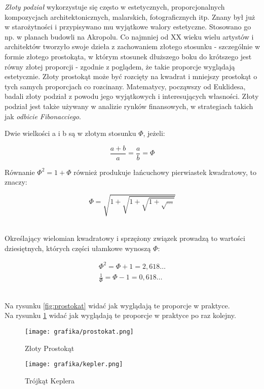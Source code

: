 \documentclass{article}
\begin{document}
\emph{Złoty podział} wykorzystuje się często w estetycznych, proporcjonalnych kompozycjach architektonicznych, malarskich, fotograficznych itp. Znany był już w starożytności i przypisywano mu wyjątkowe walory estetyczne. Stosowano go np. w planach budowli na Akropolu. Co najmniej od XX wieku wielu artystów i architektów tworzyło swoje dzieła z zachowaniem złotego stosunku - szczególnie w formie złotego prostokąta, w którym stosunek dłuższego boku do krótszego jest równy złotej proporcji - zgodnie z poglądem, że takie proporcje wyglądają estetycznie. Złoty prostokąt może być rozcięty na kwadrat i mniejszy prostokąt o tych samych proporcjach co rozcinany. Matematycy, począwszy od Euklidesa, badali złoty podział z powodu jego wyjątkowych i interesujących własności. Złoty podział jest także używany w analizie rynków finansowych, w strategiach takich jak \emph{odbicie Fibonacciego}.
\\
 \begin{center}Dwie wielkości a i b są w złotym stosunku $\Phi$, jeżeli:\end{center}
\begin{equation}
\frac{a+b}{a} = \frac{a}{b} = \Phi
\end{equation}
\begin{center} Równanie \begin{math} \Phi^{2} = 1 + \Phi \end{math} również produkuje łańcuchowy pierwiastek kwadratowy, to znaczy:\end{center}
\begin{equation}
\Phi = \sqrt{ 1+\sqrt{1+{\sqrt{1+{\sqrt{\ldots}}}}}}
\end{equation}
\\
\begin{center}Określający wielomian kwadratowy i sprzężony związek prowadzą to wartości dziesiętnych, których części ułamkowe wynoszą $\Phi$:\end{center}
\begin{eqnarray}
\Phi^{2} = \Phi + 1 = 2,618\ldots
\\
\frac{1}{\Phi} = \Phi - 1 = 0,618\ldots
\end{eqnarray}
\\
\begin{flushright}
Na rysunku \ref{fig:prostokat} widać jak wyglądają te proporcje w praktyce.
\\
Na rysunku \ref{fig:kepler} widać jak wyglądają te proporcje w praktyce po raz kolejny.
\end{flushright}
\newpage
\begin{figure}
\centering
\texttt{[image: grafika/prostokat.png]}
\caption{Złoty Prostokąt}
\label{fig:prostokat}
\centering
\texttt{[image: grafika/kepler.png]}
\caption{Trójkąt Keplera}
\label{fig:kepler}
\end{figure}
\end{document}
